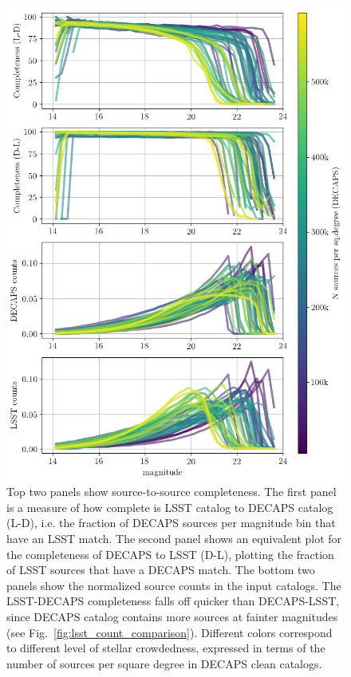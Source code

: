 \documentclass[DM,lsstdraft,toc,usenatbib,authoryear]{lsstdoc}
\begin{document}
\begin{figure}
\begin{centering}
\includegraphics[width=0.75\columnwidth]{figs/completeness_4_panels_nomarker.png}
\caption{Top two panels show source-to-source completeness.  The first panel is a measure of how complete is LSST catalog to DECAPS catalog (L-D),  i.e. the fraction of DECAPS sources per magnitude bin that have an LSST match.   The second panel shows an equivalent plot for the completeness of DECAPS to LSST (D-L), plotting the fraction of LSST sources that have a DECAPS match.  The bottom two panels show the normalized source counts  in the input catalogs. The LSST-DECAPS completeness falls off quicker than DECAPS-LSST, since DECAPS catalog contains more sources at fainter magnitudes (see Fig.~\ref{fig:lsst_count_comparison}). Different colors correspond to different level of stellar crowdedness, expressed in terms of the number of sources per square degree in DECAPS clean catalogs.}
\label{fig:completeness}
\end{centering}
\end{figure}
\end{document}
